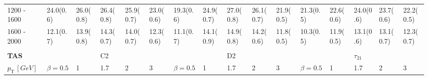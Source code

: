 \begin{table}
{\begin{tabular}{llllllllllllllll}
\multicolumn{1}{l||}{1200 - 1600}    & \multicolumn{1}{l|}{24.0(0.6)}        & \multicolumn{1}{l|}{26.0(0.8)} & \multicolumn{1}{l|}{26.4(0.8)} 		& \multicolumn{1}{l|}{25.9(0.7)} & \multicolumn{1}{l||}{23.0(0.6)} 		& \multicolumn{1}{l|}{19.3(0.6)}        & \multicolumn{1}{l|}{24.9(0.7)} & \multicolumn{1}{l|}{27.0(0.8)} 		& \multicolumn{1}{l|}{26.1(0.7)} 						& \multicolumn{1}{l||}{21.9(0.5)} & \multicolumn{1}{l|}{21.3(0.5)}        & \multicolumn{1}{l|}{22.6(0.6)} & \multicolumn{1}{l|}{24.0(0.6)} & \multicolumn{1}{l|}{23.7(0.6)} & \multicolumn{1}{l|}{22.2(0.5)} \\
\multicolumn{1}{l||}{1600 - 2000}    & \multicolumn{1}{l|}{12.1(0.7)}        & \multicolumn{1}{l|}{13.9(0.8)} & \multicolumn{1}{l|}{14.3(0.7)}  	& \multicolumn{1}{l|}{14.0(0.7)} & \multicolumn{1}{l||}{12.3(0.6)} 		& \multicolumn{1}{l|}{11.1(0.7)}        & \multicolumn{1}{l|}{14.1(0.9)} & \multicolumn{1}{l|}{14.9(0.8)} 		& \multicolumn{1}{l|}{14.2(0.6)} 						& \multicolumn{1}{l||}{11.8(0.5)} & \multicolumn{1}{l|}{10.3(0.5)}        & \multicolumn{1}{l|}{11.9(0.5)} & \multicolumn{1}{l|}{13.1(0.6)} & \multicolumn{1}{l|}{13.1(0.7)} & \multicolumn{1}{l|}{12.3(0.7)} \\ \hline
                                    &                                  &                           &                           &                	           &                           &                                  &                           &                           &                           &                           &                                  &                           &                           &                           &                           \\
\multicolumn{1}{l||}{\textbf{TAS}}            &                                  &                           & C2                        &                           & \multicolumn{1}{l|}{}     &                                  &                           & D2                        &                           & \multicolumn{1}{l|}{}     &                                  &                           & $\tau_{21}$               &                           & \multicolumn{1}{l|}{}     \\ \hline
\multicolumn{1}{l||}{$p_{\mathrm{T}} \, [GeV]$} & \multicolumn{1}{l|}{$\beta=0.5$} & \multicolumn{1}{l|}{1}        & \multicolumn{1}{l|}{1.7}    & \multicolumn{1}{l|}{2}    & \multicolumn{1}{l||}{3}    & \multicolumn{1}{l|}{$\beta=0.5$} & \multicolumn{1}{l|}{1}    & \multicolumn{1}{l|}{1.7}  & \multicolumn{1}{l|}{2}    & \multicolumn{1}{l||}{3}    & \multicolumn{1}{l|}{$\beta=0.5$} & \multicolumn{1}{l|}{1}    & \multicolumn{1}{l|}{1.7}  & \multicolumn{1}{l|}{2}    & \multicolumn{1}{l|}{3}    \\ \hline \hline

\end{tabular}}
\end{table}
